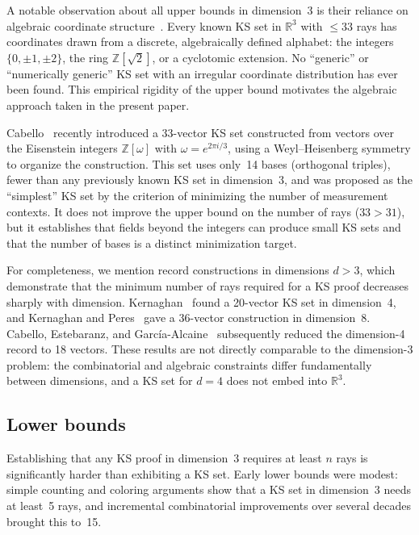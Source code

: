 \documentclass[twocolumn,pra,superscriptaddress,nofootinbib]{revtex4-2}
\newcommand{\R}{\mathbb{R}}
\newcommand{\Z}{\mathbb{Z}}
\begin{document}
A notable observation about all upper bounds in dimension~3 is their reliance on
algebraic coordinate structure~\cite{Pavicic2004,Pavicic2019}.  Every known KS set in $\R^3$ with $\leq 33$
rays has coordinates drawn from a discrete, algebraically defined alphabet: the
integers $\{0,\pm 1,\pm 2\}$, the ring $\Z[\sqrt{2}]$, or a cyclotomic extension.
No ``generic'' or ``numerically generic'' KS set with an irregular coordinate
distribution has ever been found.  This empirical rigidity of the upper bound
motivates the algebraic approach taken in the present paper.

Cabello~\cite{Cabello2025simplest} recently introduced a 33-vector KS set
constructed from vectors over the Eisenstein integers $\Z[\omega]$ with
$\omega = e^{2\pi i/3}$, using a Weyl--Heisenberg symmetry to organize the
construction.  This set uses only~14 bases (orthogonal triples), fewer than any
previously known KS set in dimension~3, and was proposed as the ``simplest'' KS
set by the criterion of minimizing the number of measurement contexts.  It does
not improve the upper bound on the number of rays ($33 > 31$), but it establishes
that fields beyond the integers can produce small KS sets and that the number of
bases is a distinct minimization target.

For completeness, we mention record constructions in dimensions $d > 3$, which
demonstrate that the minimum number of rays required for a KS proof decreases
sharply with dimension.  Kernaghan~\cite{Kernaghan1994} found a 20-vector KS set
in dimension~4, and Kernaghan and Peres~\cite{KernaghanPeres1995} gave a 36-vector
construction in dimension~8.  Cabello, Estebaranz, and
Garc\'ia-Alcaine~\cite{CabelloEstebaranzGarcia1996} subsequently reduced the
dimension-4 record to 18 vectors.  These results are not directly comparable to
the dimension-3 problem: the combinatorial and algebraic constraints differ
fundamentally between dimensions, and a KS set for $d = 4$ does not embed into
$\R^3$.

\subsection{Lower bounds}
\label{sec:prior:lower}

Establishing that any KS proof in dimension~3 requires at least $n$ rays is
significantly harder than exhibiting a KS set.  Early lower bounds were modest:
simple counting and coloring arguments show that a KS set in dimension~3 needs
at least~5 rays, and incremental combinatorial improvements over several decades
brought this to~15.
\end{document}
